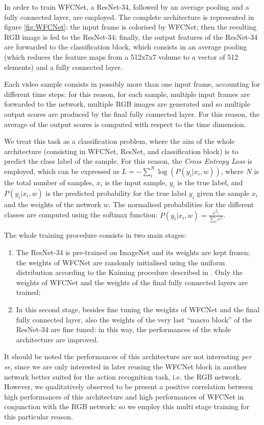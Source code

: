 \documentclass[10pt,twocolumn,letterpaper]{article}
\begin{document}
In order to train WFCNet, a ResNet-34, followed by an average pooling and a fully connected layer, are employed. The complete architecture is represented in figure \ref{fig:WFCNet}: the input frame is colorised by WFCNet; then the resulting RGB image is fed to the ResNet-34; finally, the output features of the ResNet-34 are forwarded to the classification block, which consists in an average pooling (which reduces the feature maps from a 512x7x7 volume to a vector of 512 elements) and a fully connected layer.

Each video sample consists in possibly more than one input frame, accounting for different time steps: for this reason, for each sample, multiple input frames are forwarded to the network, multiple RGB images are generated and so multiple output scores are produced by the final fully connected layer. For this reason, the average of the output scores is computed with respect to the time dimension.

We treat this task as a classification problem, where the aim of the whole architecture (consisting in WFCNet, ResNet, and classification block) is to predict the class label of the sample. For this reason, the \textit{Cross Entropy Loss} is employed, which can be expressed as ${L = -\sum_i^N{\log(P(y_i | x_i, w))}}$, where $N$ is the total number of samples, $x_i$ is the input sample, $y_i$ is the true label, and ${P(y_i | x_i, w)}$ is the predicted probability for the true label $y_i$ given the sample $x_i$ and the weights of the network $w$. The normalised probabilities for the different classes are computed using the softmax function: ${P(y_i | x_i, w) = \frac{e^{f_{y_i}}}{\sum_i e^{f_i}}}$.

The whole training procedure consists in two main stages:
\begin{enumerate}
	\item The ResNet-34 is pre-trained on ImageNet and its weights are kept frozen; the weights of WFCNet are randomly initialised using the uniform distribution according to the Kaiming procedure described in \cite{he2015delving}. Only the weights of WFCNet and the weights of the final fully connected layers are trained;
	\item In this second stage, besides fine tuning the weights of WFCNet and the final fully connected layer, also the weights of the very last ``macro block'' of the ResNet-34 are fine tuned: in this way, the performances of the whole architecture are improved.
\end{enumerate}
It should be noted the performances of this architecture are not interesting \textit{per se}, since we are only interested in later reusing the WFCNet block in another network better suited for the action recognition task, i.e. the RGB network. However, we qualitatively observed to be present a positive correlation between high performances of this architecture and high performances of WFCNet in conjunction with the RGB network: so we employ this multi stage training for this particular reason.
\end{document}
